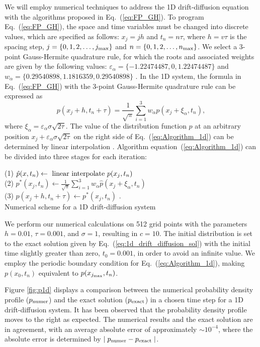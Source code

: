\documentclass[aps,pre,reprint,superscriptaddress,showpacs,amsmath
,floatfix
]{revtex4-2}
\newcommand{\eq}[1]{Eq.~(\ref{#1})}
\newcommand{\eqa}[1]{equation~(\ref{#1})}
\begin{document}
We will employ numerical techniques to address the 1D drift-diffusion equation with the algorithms proposed in \eq{eq:FP_GH}. To program \eq{eq:FP_GH}, the space and time variables must be changed into discrete values, which are specified as follows: $x_j = jh$ and $t_n = n\tau$, where $h=v\tau$ is the spacing step, $j = \{0, 1, 2, \dots, j_\textnormal{max}\}$ and $n = \{0, 1, 2, \dots, n_\textnormal{max}\}$. We select a 3-point Gauss-Hermite quadrature rule, for which the roots and associated weights are given by the following values: $\varepsilon_\alpha = \{-1.22474487, 0, 1.22474487\}$ and $w_\alpha = \{0.29540898, 1.1816359, 0.29540898\}$ \cite{abramowitz1972handbook}. In the 1D system, the formula in \eq{eq:FP_GH} with the 3-point Gauss-Hermite quadrature rule can be expressed as
\begin{equation}\label{eq:Algorithm_1d}
    p(x_j + h, t_n + \tau) = \frac{1}{\sqrt\pi}\sum_{i=1}^3 w_\alpha p(x_j + \xi_\alpha, t_n) ,
\end{equation}
where $\xi_\alpha = \varepsilon_\alpha \sigma\sqrt{2\tau}$. The value of the distribution function $p$ at an arbitrary position $x_j + \varepsilon_\alpha \sigma\sqrt{2\tau}$ on the right side of \eq{eq:Algorithm_1d} can be determined by linear interpolation \cite{NumericalRecipes}. Algorithm \eqa{eq:Algorithm_1d} can be divided into three stages for each iteration:
\begin{algorithm}
(1) $\hat{p}(x, t_n) \gets \textnormal{ linear interpolate} ~p(x_j, t_n)$ \\
(2) $p^\ast(x_j, t_n) \gets \frac{1}{\sqrt\pi}\sum_{i=1}^3 w_\alpha \hat{p}(x_j + \xi_\alpha, t_n)$ \\
(3) $p(x_j + h, t_n + \tau) \gets p^\ast(x_j, t_n)$ . \\

\caption{Numerical scheme for a 1D drift-diffusion system}
\end{algorithm}

We perform our numerical calculations on 512 grid points with the parameters $h=0.01$, $\tau=0.001$, and $\sigma=1$, resulting in $c=10$. The initial distribution is set to the exact solution given by \eq{eq:1d_drift_diffusion_sol} with the initial time slightly greater than zero, $t_0 = 0.001$, in order to avoid an infinite value. We employ the periodic boundary condition for \eq{eq:Algorithm_1d}, making $p(x_0,t_n)$ equivalent to $p(x_{j_\textnormal{max}}, t_n)$. 

Figure \ref{fig:p1d} displays a comparison between the numerical probability density profile ($p_\textnormal{numer}$) and the exact solution ($p_\textnormal{exact}$) in a chosen time step for a 1D drift-diffusion system. It has been observed that the probability density profile moves to the right as expected. The numerical results and the exact solution are in agreement, with an average absolute error of approximately $\sim 10^{-4}$, where the absolute error is determined by $\mid p_\textnormal{numer} - p_\textnormal{exact} \mid$.
\end{document}
